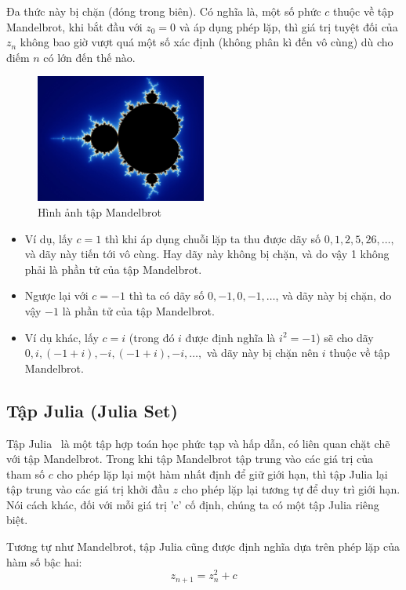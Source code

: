 \documentclass[oneside,final]{report}
\begin{document}
Đa thức này bị chặn (đóng trong biên). Có nghĩa là, một số phức $c$ thuộc về tập Mandelbrot, khi bắt đầu với $z_0=0$ và áp dụng phép lặp, thì giá trị tuyệt đối của $z_n$ không bao giờ vượt quá một số xác định (không phân kì đến vô cùng) dù cho điếm $n$ có lớn đến thế nào.
\begin{figure}[h]
  \centering
  \includegraphics[width=0.5\textwidth]{assets/images/mandelbrot.jpg}
  \caption{Hình ảnh tập Mandelbrot}
  \label{fig:mandelbrot}
\end{figure}
\begin{itemize}
  \item Ví dụ, lấy $c = 1$ thì khi áp dụng chuỗi lặp ta thu được dãy số $0, 1, 2, 5, 26,\ldots,$ và dãy này tiến tới vô cùng. Hay dãy này không bị chặn, và do vậy 1 không phải là phần tử của tập Mandelbrot.
  \item Ngược lại với $c = -1$ thì ta có dãy số $0, -1, 0, -1, \ldots$, và dãy này bị chặn, do vậy $-1$ là phần tử của tập Mandelbrot.
  \item Ví dụ khác, lấy $c = i$ (trong đó $i$ được định nghĩa là $i^2 = -1$) sẽ cho dãy $0, i, (-1 + i), -i, (-1 + i), -i,\ldots,$ và dãy này bị chặn nên $i$ thuộc về tập Mandelbrot. 
\end{itemize}
\subsection{Tập Julia (Julia Set)}
Tập Julia~\cite{enwiki:julia-set} là một tập hợp toán học phức tạp và hấp dẫn, có liên quan chặt chẽ với tập Mandelbrot. Trong khi tập Mandelbrot tập trung vào các giá trị của tham số $c$ cho phép lặp lại một hàm nhất định để giữ giới hạn, thì tập Julia lại tập trung vào các giá trị khởi đầu $z$ cho phép lặp lại tương tự để duy trì giới hạn. Nói cách khác, đối với mỗi giá trị 'c' cố định, chúng ta có một tập Julia riêng biệt.

Tương tự như Mandelbrot, tập Julia cũng được định nghĩa dựa trên phép lặp của hàm số bậc hai: $$z_{n+1} = z_n^2 + c$$
\end{document}
